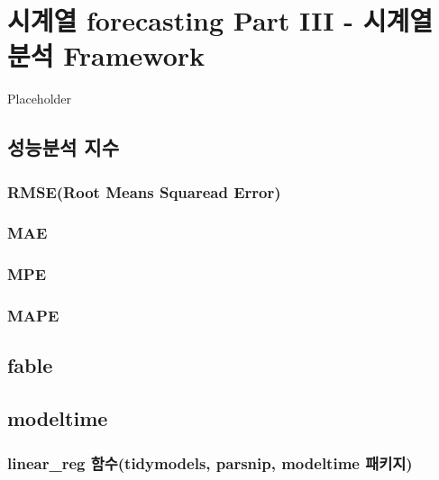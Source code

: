 \documentclass[
]{book}
\begin{document}
\hypertarget{uxc2dcuxacc4uxc5f4-forecasting-part-iii---uxc2dcuxacc4uxc5f4-uxbd84uxc11d-framework}{%
\chapter{시계열 forecasting Part III - 시계열 분석 Framework}\label{uxc2dcuxacc4uxc5f4-forecasting-part-iii---uxc2dcuxacc4uxc5f4-uxbd84uxc11d-framework}}

Placeholder

\hypertarget{uxc131uxb2a5uxbd84uxc11d-uxc9c0uxc218}{%
\section{성능분석 지수}\label{uxc131uxb2a5uxbd84uxc11d-uxc9c0uxc218}}

\hypertarget{rmseroot-means-squaread-error}{%
\subsection{RMSE(Root Means Squaread Error)}\label{rmseroot-means-squaread-error}}

\hypertarget{mae}{%
\subsection{MAE}\label{mae}}

\hypertarget{mpe}{%
\subsection{MPE}\label{mpe}}

\hypertarget{mape}{%
\subsection{MAPE}\label{mape}}

\hypertarget{fable}{%
\section{fable}\label{fable}}

\hypertarget{modeltime-1}{%
\section{modeltime}\label{modeltime-1}}

\hypertarget{linear_reg-uxd568uxc218tidymodels-parsnip-modeltime-uxd328uxd0a4uxc9c0}{%
\subsection{linear\_reg 함수(tidymodels, parsnip, modeltime 패키지)}\label{linear_reg-uxd568uxc218tidymodels-parsnip-modeltime-uxd328uxd0a4uxc9c0}}
\end{document}
